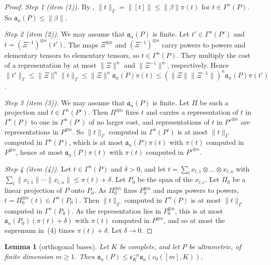 \documentclass[11pt]{amsart}
\newtheorem{lemma}[theorem]{Lemma}
\theoremstyle{definition}
\theoremstyle{remark}
\numberwithin{equation}{section}
\newcommand{\norm}[1]{\lVert #1\rVert}
\theoremstyle{plain}
\theoremstyle{definition}
\theoremstyle{plain}
\begin{document}
\begin{proof}
\emph{Step 1 (item (1)).} By \cite[Lemma~Q.1(3)]{I}, $\norm t_\Gamma=\norm{[t]}\le\norm\beta\pi(t)$ for $t\in\Gamma^n(P)$. So $\mathfrak a_n(P)\le\norm\beta$.

\emph{Step 2 (item (2)).} We may assume that $\mathfrak a_n(P)$ is finite. Let $t'\in\Gamma^n(P')$ and $t=(\Xi^{-1})^{\otimes n}(t')$. The maps $\Xi^{\otimes n}$ and $(\Xi^{-1})^{\otimes n}$ carry powers to powers and elementary tensors to elementary tensors, so $t\in\Gamma^n(P)$. They multiply the cost of a representation by at most $\norm\Xi^n$ and $\norm{\Xi^{-1}}^n$, respectively. Hence $\norm{t'}_\Gamma\le\norm\Xi^n\norm t_\Gamma\le\norm\Xi^n\mathfrak a_n(P)\pi(t)\le(\norm\Xi\norm{\Xi^{-1}})^n\mathfrak a_n(P)\pi(t')$.

\emph{Step 3 (item (3)).} We may assume that $\mathfrak a_n(P)$ is finite. Let $\Pi$ be such a projection and $t\in\Gamma^n(P')$. Then $\Pi^{\otimes n}$ fixes $t$ and carries a representation of $t$ in $\Gamma^n(P)$ to one in $\Gamma^n(P')$ of no larger cost, and representations of $t$ in $P'^{\otimes n}$ are representations in $P^{\otimes n}$. So $\norm t_\Gamma$ computed in $\Gamma^n(P')$ is at most $\norm t_\Gamma$ computed in $\Gamma^n(P)$, which is at most $\mathfrak a_n(P)\pi(t)$ with $\pi(t)$ computed in $P^{\otimes n}$, hence at most $\mathfrak a_n(P)\pi(t)$ with $\pi(t)$ computed in $P'^{\otimes n}$.

\emph{Step 4 (item (4)).} Let $t\in\Gamma^n(P)$ and $\delta>0$, and let $t=\sum_lx_{l,1}\otimes\dots\otimes x_{l,n}$ with $\sum_l\norm{x_{l,1}}\cdots\norm{x_{l,n}}\le\pi(t)+\delta$. Let $P_0$ be the span of the $x_{l,c}$. Let $\Pi_0$ be a linear projection of $P$ onto $P_0$. As $\Pi_0^{\otimes n}$ fixes $P_0^{\otimes n}$ and maps powers to powers, $t=\Pi_0^{\otimes n}(t)\in\Gamma^n(P_0)$. Then $\norm t_\Gamma$ computed in $\Gamma^n(P)$ is at most $\norm t_\Gamma$ computed in $\Gamma^n(P_0)$. As the representation lies in $P_0^{\otimes n}$, this is at most $\mathfrak a_n(P_0)(\pi(t)+\delta)$ with $\pi(t)$ computed in $P^{\otimes n}$, and so at most the supremum in~(4) times $\pi(t)+\delta$. Let $\delta\to0$.
\end{proof}

\begin{lemma}[orthogonal bases]\label{dp:lem:orthogonal}
Let $K$ be complete, and let $P$ be ultrametric, of finite dimension $m\ge1$. Then $\mathfrak a_n(P)\le\mathfrak c_K^{-n}\mathfrak a_n(c_0([m],K))$.
\end{lemma}
\end{document}
